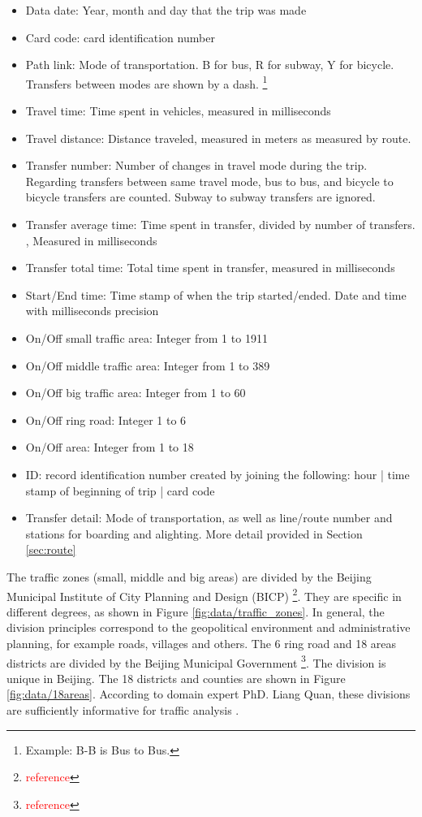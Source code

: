 \documentclass{article}
\newcommand{\selfnote}[1]{\footnote{\textcolor{red}{#1}}}
\begin{document}
\begin{itemize}
\item Data date: Year, month and day that the trip was made
\item Card code: card identification number
\item Path link: Mode of transportation. B for bus, R for subway, Y for bicycle. Transfers between modes are shown by a dash. \footnote{Example: B-B is Bus to Bus.} 
\item Travel time: Time spent in vehicles, measured in milliseconds
\item Travel distance: Distance traveled, measured in meters as measured by route. 
\item Transfer number: Number of changes in travel mode during the trip. Regarding transfers between same travel mode, bus to bus, and bicycle to bicycle transfers are counted. Subway to subway transfers are ignored. 
\item Transfer average time: Time spent in transfer, divided by number of transfers. , Measured in milliseconds
\item Transfer total time: Total time spent in transfer, measured in milliseconds
\item Start/End time: Time stamp of when the trip started/ended. Date and time with milliseconds precision
\item On/Off small traffic area: Integer from 1 to 1911
\item On/Off middle traffic area: Integer from 1 to 389
\item On/Off big traffic area: Integer from 1 to 60
\item On/Off ring road: Integer 1 to 6
\item On/Off area: Integer from 1 to 18
\item ID: record identification number created by joining the following: hour | time stamp of beginning of trip | card code
\item Transfer detail: Mode of transportation, as well as line/route number and stations for boarding and alighting. More detail provided in Section \ref{sec:route}
\end{itemize}

The traffic zones (small, middle and big areas) are divided by the Beijing Municipal Institute of City Planning and Design (BICP) \selfnote{reference}. They are specific in different degrees, as shown in Figure \ref{fig:data/traffic_zones}. In general, the division principles correspond to the geopolitical environment and administrative planning, for example roads, villages and others. The 6 ring road and 18 areas districts are divided by the Beijing Municipal Government \selfnote{reference}. The division is unique in Beijing. The 18 districts and counties are shown in Figure \ref{fig:data/18areas}. According to domain expert PhD. Liang Quan, these divisions are sufficiently informative for traffic analysis \cite{liang}.
\end{document}

